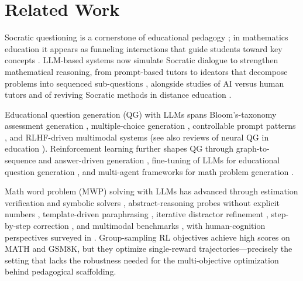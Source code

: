 \documentclass[sigconf, anonymous, review, screen]{acmart}
\begin{document}
\section{Related Work}
Socratic questioning is a cornerstone of educational pedagogy \cite{wood1976role}; in mathematics education it appears as funneling interactions that guide students toward key concepts \cite{wood1994patterns}. LLM-based systems now simulate Socratic dialogue to strengthen mathematical reasoning, from prompt-based tutors \cite{ding2024boosting, xi2025investigating, adewumi2026findings} to ideators that decompose problems into sequenced sub-questions \cite{lei2025motivgraph}, alongside studies of AI versus human tutors and of reviving Socratic methods in distance education \cite{fakour2025socratic, stamatellos2025socratic}.

Educational question generation (QG) with LLMs spans Bloom's-taxonomy assessment generation \cite{scaria2024automated, duong2024bloomllm}, multiple-choice generation \cite{biancini2024multiple}, controllable prompt patterns \cite{li2024planning}, and RLHF-driven multimodal systems \cite{mubarak2025quesgenie} (see also reviews of neural QG in education \cite{al2024review}). Reinforcement learning further shapes QG through graph-to-sequence and answer-driven generation \cite{guan2023reinforcement, chen2019reinforcement, wang2020answer}, fine-tuning of LLMs for educational question generation \cite{lamsiyah2024fine}, and multi-agent frameworks for math problem generation \cite{fahad2023reinforcement}.

Math word problem (MWP) solving with LLMs has advanced through estimation verification and symbolic solvers \cite{piehl2025solving}, abstract-reasoning probes without explicit numbers \cite{cheng2025can}, template-driven paraphrasing \cite{kang2025template}, iterative distractor refinement \cite{yang2025iterative}, step-by-step correction \cite{li2025step}, and multimodal benchmarks \cite{zhang2024mathverse}, with human-cognition perspectives surveyed in \cite{huang2025foundation}. Group-sampling RL objectives \cite{shao2024deepseekmath} achieve high scores on MATH and GSM8K, but they optimize single-reward trajectories---precisely the setting that lacks the robustness needed for the multi-objective optimization behind pedagogical scaffolding.
\end{document}
